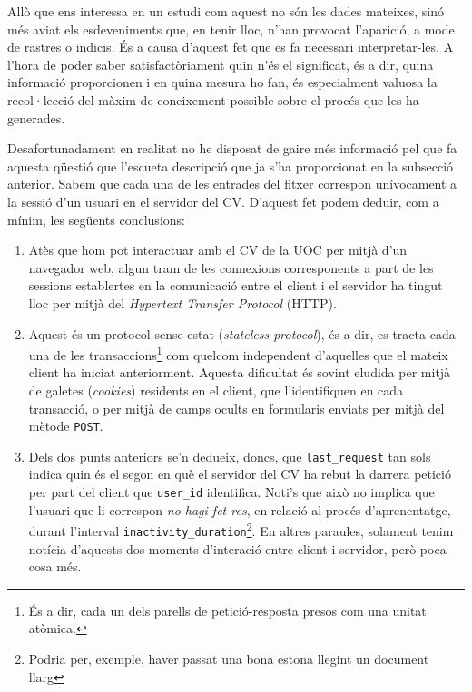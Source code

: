 \documentclass[
	a4paper,
	twoside,
	justified
]{tufte-book}
\begin{document}
Allò que ens interessa en un estudi com aquest no són les dades mateixes, sinó més aviat els esdeveniments que, en tenir lloc, n'han provocat l'aparició, a mode de rastres o indicis. És a causa d'aquest fet que es fa necessari interpretar-les. A l'hora de poder saber satisfactòriament quin n'és el significat, és a dir, quina informació proporcionen i en quina mesura ho fan, és especialment valuosa la recol·lecció del màxim de coneixement possible sobre el procés que les ha generades. 

Desafortunadament en realitat no he disposat de gaire més informació pel que fa aquesta qüestió que l'escueta descripció que ja s'ha proporcionat en la subsecció anterior. Sabem que cada una de les entrades del fitxer correspon unívocament a la sessió d'un usuari en el servidor del CV. D'aquest fet podem deduir, com a mínim, les següents conclusions:

\begin{enumerate}[(1)]

\item Atès que hom pot interactuar amb el CV de la UOC per mitjà d'un navegador web, algun tram de les connexions corresponents a part de les sessions establertes en la comunicació entre el client i el servidor ha tingut lloc per mitjà del \emph{Hypertext Transfer Protocol} (HTTP). 

\item Aquest és un protocol sense estat (\emph{stateless protocol})\citep[cap. 2]{kurose09}, és a dir, es tracta cada una de les transaccions\footnote{És a dir, cada un dels parells de petició-resposta presos com una unitat atòmica.} com quelcom independent d'aquelles que el mateix client ha iniciat anteriorment. Aquesta dificultat és sovint eludida per mitjà de galetes (\emph{cookies}) residents en el client, que l'identifiquen en cada transacció, o per mitjà de camps ocults en formularis enviats per mitjà del mètode \texttt{POST}.

\item Dels dos punts anteriors se'n dedueix, doncs, que \texttt{last\_request} tan sols indica quin és el segon en què el servidor del CV ha rebut la darrera petició per part del client que \texttt{user\_id} identifica. Noti's que això no implica que l'usuari que li correspon \emph{no hagi fet res}, en relació al procés d'aprenentatge, durant l'interval \texttt{inactivity\_duration}\footnote{Podria per, exemple, haver passat una bona estona llegint un document llarg}. En altres paraules, solament tenim notícia d'aquests dos moments d'interació entre client i servidor, però poca cosa més.   
\end{enumerate} 
\end{document}
